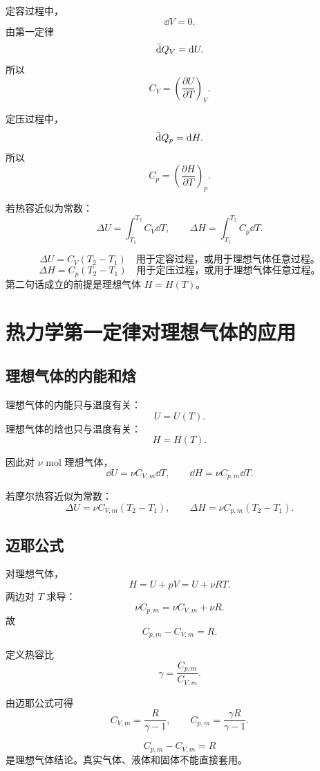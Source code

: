 定容过程中，
\[
  \dd V=0.
\]
由第一定律
\[
  \mathop{}\!\bar{\mathrm{d}} Q_V=\mathop{}\!\mathrm{d} U.
\]
所以
\[
  \boxed{
  C_V=\left(\frac{\partial U}{\partial T}\right)_V
  }.
\]

定压过程中，
\[
  \mathop{}\!\bar{\mathrm{d}} Q_p=\mathop{}\!\mathrm{d} H.
\]
所以
\[
  \boxed{
  C_p=\left(\frac{\partial H}{\partial T}\right)_p
  }.
\]

若热容近似为常数：
\[
  \Delta U=\int_{T_1}^{T_2}C_V\dd T,
  \qquad
  \Delta H=\int_{T_1}^{T_2}C_p\dd T.
\]

\begin{FormulaBox}[热容计算的最基本结论]
\[
  \Delta U=C_V(T_2-T_1)
  \quad\text{用于定容过程，或用于理想气体任意过程。}
\]
\[
  \Delta H=C_p(T_2-T_1)
  \quad\text{用于定压过程，或用于理想气体任意过程。}
\]
第二句话成立的前提是理想气体 \(H=H(T)\)。
\end{FormulaBox}

\section{热力学第一定律对理想气体的应用}

\subsection{理想气体的内能和焓}

理想气体的内能只与温度有关：
\[
  \boxed{
  U=U(T)
  }.
\]
理想气体的焓也只与温度有关：
\[
  \boxed{
  H=H(T)
  }.
\]

因此对 \(\nu\) mol 理想气体，
\[
  \boxed{
  \dd U=\nu C_{V,m}\dd T
  },
  \qquad
  \boxed{
  \dd H=\nu C_{p,m}\dd T
  }.
\]

若摩尔热容近似为常数：
\[
  \Delta U=\nu C_{V,m}(T_2-T_1),
  \qquad
  \Delta H=\nu C_{p,m}(T_2-T_1).
\]

\subsection{迈耶公式}

对理想气体，
\[
  H=U+pV=U+\nu RT.
\]
两边对 \(T\) 求导：
\[
  \nu C_{p,m}
  =
  \nu C_{V,m}+\nu R.
\]
故
\[
  \boxed{
  C_{p,m}-C_{V,m}=R
  }.
\]

定义热容比
\[
  \boxed{
  \gamma=\frac{C_{p,m}}{C_{V,m}}
  }.
\]

由迈耶公式可得
\[
  C_{V,m}=\frac{R}{\gamma-1},
  \qquad
  C_{p,m}=\frac{\gamma R}{\gamma-1}.
\]

\begin{WarnBox}
\[
  C_{p,m}-C_{V,m}=R
\]
是理想气体结论。真实气体、液体和固体不能直接套用。
\end{WarnBox}

